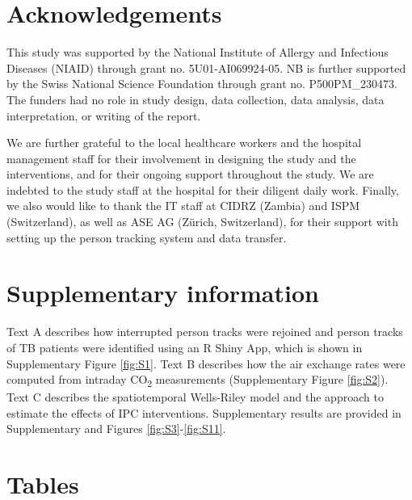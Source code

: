 \documentclass[11pt]{article}
\begin{document}
\section{Acknowledgements}\label{acknowledgements}

This study was supported by the National Institute of Allergy and Infectious Diseases (NIAID) through grant no. 5U01-AI069924-05. NB is further supported by the Swiss National Science Foundation through grant no. P500PM\_230473. The funders had no role in study design, data collection, data analysis, data interpretation, or writing of the report.

We are further grateful to the local healthcare workers and the hospital management staff for their involvement in designing the study and the interventions, and for their ongoing support throughout the study. We are indebted to the study staff at the hospital for their diligent daily work. Finally, we also would like to thank the IT staff at CIDRZ (Zambia) and ISPM (Switzerland), as well as ASE AG (Zürich, Switzerland), for their support with setting up the person tracking system and data transfer.

\section{Supplementary information}\label{supplementary-information}

Text A describes how interrupted person tracks were rejoined and person tracks of TB patients were identified using an R Shiny App, which is shown in Supplementary Figure \ref{fig:S1}. Text B describes how the air exchange rates were computed from intraday CO\textsubscript{2} measurements (Supplementary Figure \ref{fig:S2}). Text C describes the spatiotemporal Wells-Riley model and the approach to estimate the effects of IPC interventions. Supplementary results are provided in Supplementary  and Figures \ref{fig:S3}-\ref{fig:S11}.

\clearpage

\section{Tables}\label{tables}
\end{document}
